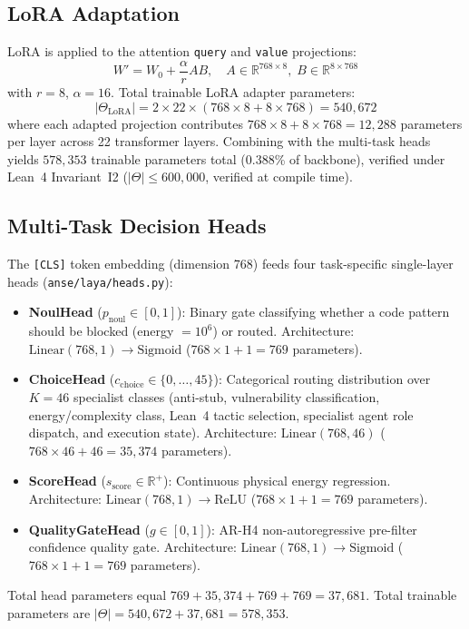\documentclass[conference]{IEEEtran}
\begin{document}
\subsection{LoRA Adaptation}

LoRA is applied to the attention \texttt{query} and \texttt{value} projections:
\begin{equation}
  W' = W_0 + \frac{\alpha}{r} AB, \quad A \in \mathbb{R}^{768 \times 8},\; B \in \mathbb{R}^{8 \times 768}
\end{equation}
with $r{=}8$, $\alpha{=}16$. Total trainable LoRA adapter parameters:
\begin{equation}
  |\Theta_{\text{LoRA}}| = 2 \times 22 \times (768 \times 8 + 8 \times 768) = 540{,}672
\end{equation}
where each adapted projection contributes $768 \times 8 + 8 \times 768 = 12{,}288$ parameters per layer across 22 transformer layers. Combining with the multi-task heads yields $578{,}353$ trainable parameters total (0.388\% of backbone), verified under Lean~4 Invariant~I2 ($|\Theta| \leq 600{,}000$, verified at compile time).

\subsection{Multi-Task Decision Heads}

The \texttt{[CLS]} token embedding (dimension 768) feeds four task-specific single-layer heads (\texttt{anse/laya/heads.py}):

\begin{itemize}
  \item \textbf{NoulHead} ($p_\text{noul} \in [0,1]$): Binary gate classifying whether
        a code pattern should be blocked (energy $= 10^6$) or routed.
        Architecture: $\text{Linear}(768, 1) \to \text{Sigmoid}$ ($768 \times 1 + 1 = 769$ parameters).
  \item \textbf{ChoiceHead} ($c_\text{choice} \in \{0, \ldots, 45\}$): Categorical routing
        distribution over $K=46$ specialist classes (anti-stub, vulnerability classification,
        energy/complexity class, Lean~4 tactic selection, specialist agent role dispatch, and execution state).
        Architecture: $\text{Linear}(768, 46)$ ($768 \times 46 + 46 = 35{,}374$ parameters).
  \item \textbf{ScoreHead} ($s_\text{score} \in \mathbb{R}^+$): Continuous physical energy regression.
        Architecture: $\text{Linear}(768, 1) \to \text{ReLU}$ ($768 \times 1 + 1 = 769$ parameters).
  \item \textbf{QualityGateHead} ($g \in [0,1]$): AR-H4 non-autoregressive pre-filter confidence quality gate.
        Architecture: $\text{Linear}(768, 1) \to \text{Sigmoid}$ ($768 \times 1 + 1 = 769$ parameters).
\end{itemize}
Total head parameters equal $769 + 35{,}374 + 769 + 769 = 37{,}681$.
Total trainable parameters are $|\Theta| = 540{,}672 + 37{,}681 = 578{,}353$.
\end{document}
